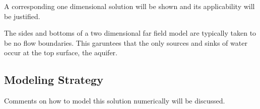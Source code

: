 \documentclass[letterpaper]{article}
\begin{document}
A corresponding one dimensional solution will be shown and its applicability 
will be justified.

The sides and bottoms of a two dimensional far field model are typically taken 
to be no flow boundaries. This garuntees that the only sources and sinks of 
water occur at the top surface, the aquifer.  

\subsection{Modeling Strategy}

Comments on how to model this solution numerically will be discussed.







\pagebreak


\end{document}
